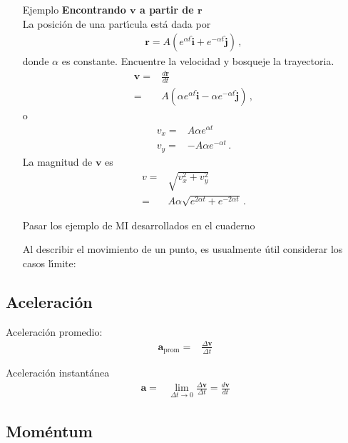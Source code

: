 \begin{itemize}
\item[Ejemplo] \textbf{Encontrando $\mathbf{v}$ a partir de $\mathbf{r}$}\\
La posici\'on de una part\'\i cula est\'a dada por
\begin{align}
  \mathbf{r}=A(e^{\alpha t}\hat{\mathbf{i}}+e^{-\alpha t}\hat{\mathbf{j}})\,,
\end{align}
donde $\alpha$ es constante. Encuentre la velocidad y bosqueje la trayectoria.
\begin{align}
    \mathbf{v}=&\frac{d\mathbf{r}}{dt}\nonumber\\
    =&A(\alpha e^{\alpha t}\hat{\mathbf{i}}-\alpha e^{-\alpha t}\hat{\mathbf{j}})\,,
\end{align}
o
\begin{align}
  v_x=&A\alpha e^{\alpha t}\nonumber\\
  v_y=&-A\alpha e^{-\alpha t}\,.
\end{align}
La magnitud de $\mathbf{v}$ es
\begin{align}
  v=&\sqrt{v_x^2+v_y^2}\nonumber\\
  =&A\alpha\sqrt{e^{2\alpha t}+e^{-2\alpha t}}\,.
\end{align}

\begin{inprogress}
  Pasar los ejemplo de MI desarrollados en el cuaderno
\end{inprogress}
Al describir el movimiento de un punto, es usualmente útil considerar los casos l\'\i mite:
\end{itemize}

\subsection{Aceleración}

Aceleración promedio:
\begin{align}
  \mathbf{a}_{\text{prom}}=&\frac{\Delta \mathbf{v}}{\Delta t}
\end{align}

Aceleración instantánea
\begin{align}
  \mathbf{a}=&\lim_{\Delta t\to 0}\frac{\Delta \mathbf{v}}{\Delta t}=\frac{d\mathbf{v}}{dt}
\end{align}

\subsection{Moméntum}

